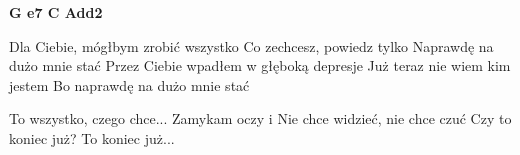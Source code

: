 \documentclass[../../../songbook.tex]{subfiles}
\begin{document}
{\color{red}\textbf{G  e7  C  Add2 } } \newline

Dla Ciebie, mógłbym zrobić wszystko \newline
Co zechcesz, powiedz tylko \newline
Naprawdę na dużo mnie stać \newline
Przez Ciebie wpadłem w głęboką depresje \newline
Już teraz nie wiem kim jestem \newline
Bo naprawdę na dużo mnie stać \newline

\-\hspace{1cm} To wszystko, czego chce...			\newline
\newline
\-\hspace{1cm} Zamykam oczy i					 \newline
\-\hspace{1cm} Nie chce widzieć, nie chce czuć 	 \newline
\-\hspace{1cm} Czy to koniec już? 				 \newline
\-\hspace{1cm} To koniec już...  				 \newline
\end{document}
